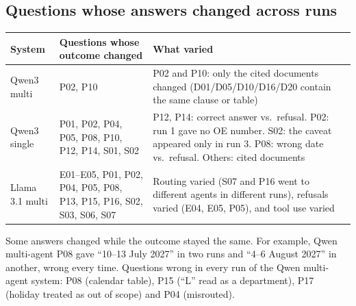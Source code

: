 \documentclass[11pt,a4paper]{article}
\begin{document}
\subsection{Questions whose answers changed across runs}
\begin{tabularx}{\textwidth}{@{}lp{4.6cm}Y@{}}
\toprule
System & Questions whose outcome changed & What varied \\ \midrule
Qwen3 multi & P02, P10 & P02 and P10: only the cited documents changed (D01/D05/D10/D16/D20 contain the same clause or table) \\
Qwen3 single & P01, P02, P04, P05, P08, P10, P12, P14, S01, S02 & P12, P14: correct answer vs.\ refusal. P02: run 1 gave no OE number. S02: the caveat appeared only in run 3. P08: wrong date vs.\ refusal. Others: cited documents \\
Llama 3.1 multi & E01--E05, P01, P02, P04, P05, P08, P13, P15, P16, S02, S03, S06, S07 & Routing varied (S07 and P16 went to different agents in different runs), refusals varied (E04, E05, P05), and tool use varied \\
\bottomrule
\end{tabularx}

\medskip
\noindent Some answers changed while the outcome stayed the same. For example, Qwen multi-agent P08 gave
``10--13 July 2027'' in two runs and ``4--6 August 2027'' in another, wrong every time. Questions wrong in every run
of the Qwen multi-agent system: P08 (calendar table), P15 (``L'' read as a department), P17 (holiday treated as out of
scope) and P04 (misrouted).
\end{document}
